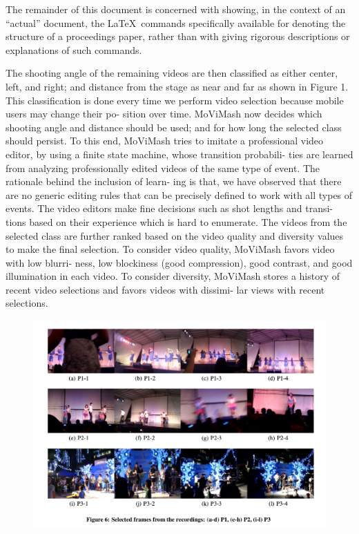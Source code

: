 \documentclass{sig-alternate}
\begin{document}
	The remainder of this document is concerned with showing, in
	the context of an ``actual'' document, the \LaTeX\ commands
	specifically available for denoting the structure of a
	proceedings paper, rather than with giving rigorous descriptions
	or explanations of such commands.
	
	The shooting angle of the remaining videos are then classified as
	either center, left, and right; and distance from the stage as near and
	far as shown in Figure 1. This classification is done every time we
	perform video selection because mobile users may change their po-
	sition over time. MoViMash now decides which shooting angle and
	distance should be used; and for how long the selected class should
	persist. To this end, MoViMash tries to imitate a professional video
	editor, by using a finite state machine, whose transition probabili-
	ties are learned from analyzing professionally edited videos of the
	same type of event. The rationale behind the inclusion of learn-
	ing is that, we have observed that there are no generic editing rules
	that can be precisely defined to work with all types of events. The
	video editors make fine decisions such as shot lengths and transi-
	tions based on their experience which is hard to enumerate.
	The videos from the selected class are further ranked based on
	the video quality and diversity values to make the final selection.
	To consider video quality, MoViMash favors video with low blurri-
	ness, low blockiness (good compression), good contrast, and good
	illumination in each video. To consider diversity, MoViMash stores
	a history of recent video selections and favors videos with dissimi-
	lar views with recent selections.
	\begin{figure}
		\centering
		\includegraphics[width=16cm height=10cm]{3.png}
	\end{figure}
\end{document}
